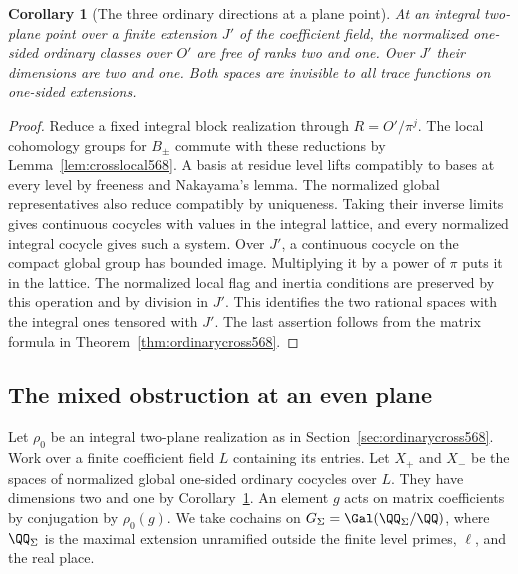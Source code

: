 \documentclass[a4paper,11pt]{article}
\newtheorem{corollary}[proposition]{Corollary}
\theoremstyle{definition}
\theoremstyle{remark}
\numberwithin{equation}{section}
\begin{document}
\begin{corollary}[The three ordinary directions at a plane point]
\leavevmode\label{cor:threecross568}
At an integral two-plane point over a finite extension \(J'\)
of the coefficient field, the normalized one-sided ordinary
classes over \(O'\) are free of ranks two and one. Over \(J'\)
their dimensions are two and one. Both spaces are invisible
to all trace functions on one-sided extensions.
\end{corollary}
\begin{proof}
Reduce a fixed integral block realization through
\(R=O'/\pi^j\). The local cohomology groups for \(B_\pm\)
commute with these reductions by Lemma~\ref{lem:crosslocal568}.
A basis at residue level lifts compatibly to bases at every
level by freeness and Nakayama's lemma. The normalized
global representatives also reduce compatibly by uniqueness.
Taking their inverse limits gives continuous cocycles with
values in the integral lattice, and every normalized integral
cocycle gives such a system. Over \(J'\), a continuous
cocycle on the compact global group has bounded image.
Multiplying it by a power of \(\pi\) puts it in the
lattice. The normalized local flag and inertia conditions
are preserved by this operation and by division in \(J'\).
This identifies the two rational spaces with the integral
ones tensored with \(J'\). The last assertion follows from
the matrix formula in Theorem~\ref{thm:ordinarycross568}.
\end{proof}


\subsection{The mixed obstruction at an even plane}
\label{sec:mixedplane569}

Let \(\rho_0\) be an integral two-plane realization as in
Section~\ref{sec:ordinarycross568}. Work over a finite coefficient
field \(L\) containing its entries. Let \(X_+\) and \(X_-\) be the
spaces of normalized global one-sided ordinary cocycles over
\(L\). They have dimensions two and one by
Corollary~\ref{cor:threecross568}. An element \(g\) acts on
matrix coefficients by conjugation by \(\rho_0(g)\). We take
cochains on \(G_\Sigma=\Gal(\QQ_\Sigma/\QQ)\), where
\(\QQ_\Sigma\) is the maximal extension unramified outside the
finite level primes, \(\ell\), and the real place.
\end{document}
